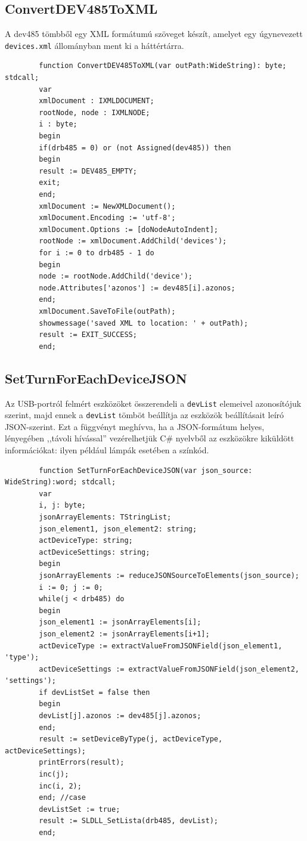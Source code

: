 \documentclass[tocnopagenum]{thesis-ekf}
\begin{document}
	\subsection{ConvertDEV485ToXML} 
	A dev485 tömbből egy XML formátumú szöveget készít, amelyet egy úgynevezett \verb*|devices.xml| állományban ment ki a háttértárra.
	
	\begin{verbatim}
		function ConvertDEV485ToXML(var outPath:WideString): byte; stdcall;
		var
		xmlDocument : IXMLDOCUMENT;
		rootNode, node : IXMLNODE;
		i : byte;
		begin
		if(drb485 = 0) or (not Assigned(dev485)) then
		begin
		result := DEV485_EMPTY;
		exit;
		end;
		xmlDocument := NewXMLDocument();
		xmlDocument.Encoding := 'utf-8';
		xmlDocument.Options := [doNodeAutoIndent];
		rootNode := xmlDocument.AddChild('devices');
		for i := 0 to drb485 - 1 do 
		begin
		node := rootNode.AddChild('device');
		node.Attributes['azonos'] := dev485[i].azonos;
		end;
		xmlDocument.SaveToFile(outPath);
		showmessage('saved XML to location: ' + outPath);
		result := EXIT_SUCCESS;
		end;
	\end{verbatim}

	\subsection{SetTurnForEachDeviceJSON} 
	Az USB-portról felmért eszközöket összerendeli a \verb*|devList| elemeivel azonosítójuk szerint, majd ennek a \verb*|devList| tömböt beállítja az eszközök beállításait leíró JSON-szerint. Ezt a függvényt meghívva, ha a JSON-formátum helyes, lényegében ,,távoli hívással'' vezérelhetjük C\# nyelvből az eszközökre kiküldött információkat: ilyen például lámpák esetében a színkód.
	
	\begin{verbatim}
		function SetTurnForEachDeviceJSON(var json_source: WideString):word; stdcall;
		var
		i, j: byte;
		jsonArrayElements: TStringList;
		json_element1, json_element2: string;
		actDeviceType: string;
		actDeviceSettings: string;
		begin
		jsonArrayElements := reduceJSONSourceToElements(json_source);
		i := 0; j := 0;
		while(j < drb485) do
		begin
		json_element1 := jsonArrayElements[i];
		json_element2 := jsonArrayElements[i+1];
		actDeviceType := extractValueFromJSONField(json_element1, 'type'); 
		actDeviceSettings := extractValueFromJSONField(json_element2, 'settings');
		if devListSet = false then 
		begin
		devList[j].azonos := dev485[j].azonos; 
		end;
		result := setDeviceByType(j, actDeviceType, actDeviceSettings);
		printErrors(result);
		inc(j);
		inc(i, 2);
		end; //case
		devListSet := true;
		result := SLDLL_SetLista(drb485, devList);
		end;
	\end{verbatim}
	
\end{document}
